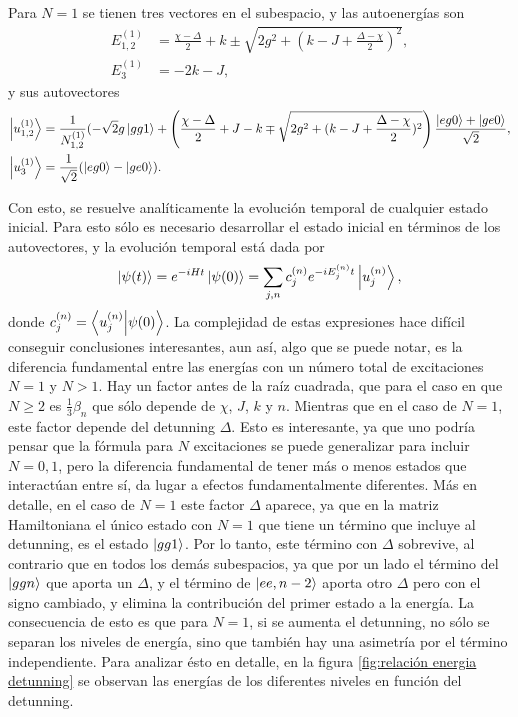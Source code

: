 Para $N=1$ se tienen tres vectores en el subespacio, y las autoenergías son
\begin{align}\label{ec4:energias n1}
    E_{1,2}^{(1)} &=\frac{\chi -\Delta}{2} +k \pm \sqrt{2g^2+(k-J+\frac{\Delta -\chi}{2} )^2},\\
    E_3^{(1)} & = -2k-J,  
\end{align}
y sus autovectores
\begin{equation}
    \begin{aligned}
        \ket{u_{1,2}^{(1)}}&=\frac{1}{N_{1,2}^{(1)}}(-\sqrt{2}g\ket{gg1}+ \left(\frac{\chi-\Delta}{2}+J-k \mp \sqrt{2g^2+(k-J+\frac{\Delta -\chi}{2} )^2} \right)\dfrac{\ket{eg0}+\ket{ge0}}{\sqrt{2}},\\
        \ket{u_3^{(1)}}&= \frac{1}{\sqrt{2}}(\ket{eg0}-\ket{ge0}).
    \end{aligned}
\end{equation}

Con esto, se resuelve analíticamente la evolución temporal de cualquier estado inicial.
Para esto sólo es necesario desarrollar el estado inicial en términos de los autovectores, y la evolución temporal está dada por
\begin{equation}
\ket{\psi(t)}=e^{-iHt}\ket{\psi(0)}=\sum_{j,n} c_j^{(n)}e^{-iE_j^{(n)}t}\ket{u_j^{(n)}},
\end{equation}
donde $c_j^{(n)}=\braket{u_j^{(n)}}{\psi(0)}$.
La complejidad de estas expresiones hace difícil conseguir conclusiones interesantes, aun así, algo que se puede notar, es la diferencia fundamental entre las energías con un número total de excitaciones $N=1$ y $N>1$. Hay un factor antes de la raíz cuadrada, que para el caso en que $N \geq 2$ es $\frac{1}{3}\beta_n$ que sólo depende de $\chi$, $J$, $k$ y $n$. Mientras que en el caso de $N=1$, este factor depende del detunning $\Delta$. Esto es interesante, ya que uno podría pensar que la fórmula para $N$ excitaciones se puede generalizar para incluir $N=0,1$, pero la diferencia fundamental de tener más o menos estados que interactúan entre sí, da lugar a efectos fundamentalmente diferentes. Más en detalle, en el caso de $N=1$ este factor $\Delta$ aparece, ya que en la matriz Hamiltoniana el único estado con $N=1$ que tiene un término que incluye al detunning, es el estado $\ket{gg1}$. Por lo tanto, este término con $\Delta$ sobrevive, al contrario que en todos los demás subespacios, ya que por un lado el término del $\ket{ggn}$ que aporta un $\Delta$, y el término de $\ket{ee,n-2}$ aporta otro $\Delta$ pero con el signo cambiado, y elimina la contribución del primer estado a la energía. La consecuencia de esto es que para $N=1$, si se aumenta el detunning, no sólo se separan los niveles de energía, sino que también hay una asimetría por el término independiente. Para analizar ésto en detalle, en la figura \ref{fig:relación energia detunning} se observan las energías de los diferentes niveles en función del detunning. 

